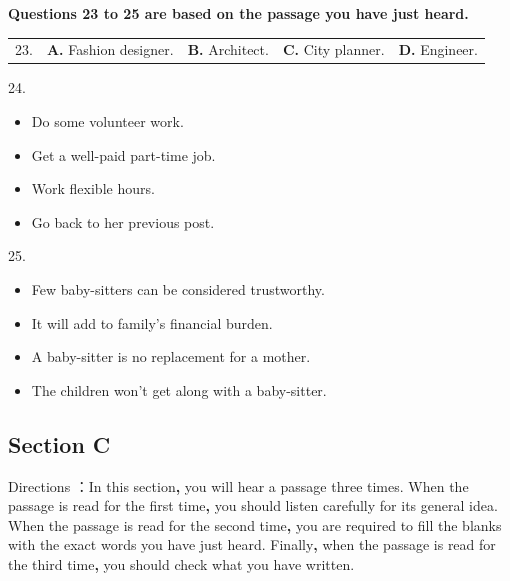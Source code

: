 \documentclass[UTF8,11pt]{ctexart}
\begin{document}
\textbf{Questions 23 to 25 are based on the passage you have just heard.}


\noindent\begin{tabularx}{\linewidth}{@{}lXXXX@{}}23. & \textbf{A.} Fashion designer. & \textbf{B.} Architect. & \textbf{C.} City planner. & \textbf{D.} Engineer.\\\end{tabularx}\par

24.


\begin{itemize}[leftmargin=2em,itemsep=.2em,topsep=.4em]\item[A.] Do some volunteer work.
\item[B.] Get a well-paid part-time job.
\item[C.] Work flexible hours.
\item[D.] Go back to her previous post.
\end{itemize}

25.


\begin{itemize}[leftmargin=2em,itemsep=.2em,topsep=.4em]\item[A.] Few baby-sitters can be considered trustworthy.
\item[B.] It will add to family’s financial burden.
\item[C.] A baby-sitter is no replacement for a mother.
\item[D.] The children won’t get along with a baby-sitter.
\end{itemize}

\subsection*{\textbf{Section C}}


Directions ：In this section\textbf{,} you will hear a passage three times. When the passage is read for the first time\textbf{,} you should listen carefully for its general idea. When the passage is read for the second time\textbf{,} you are required to fill the blanks with the exact words you have just heard. Finally\textbf{,} when the passage is read for the third time\textbf{,} you should check what you have written.
\end{document}
